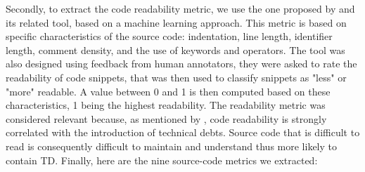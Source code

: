 
Secondly, to extract the code readability metric, we use the one proposed by \citet{Buse:tse2010} and its related tool, based on a machine learning approach. This metric is based on specific characteristics of the source code: indentation, line length, identifier length, comment density, and the use of keywords and operators. The tool was also designed using feedback from human annotators, they were asked to rate the readability of code snippets, that was then used to classify snippets as "less" or "more" readable. A value between 0 and 1 is then computed based on these characteristics, 1 being the highest readability. The readability metric was considered relevant because, as mentioned by \citet{BavotaR16}, code readability is strongly correlated with the introduction of technical debts. Source code that is difficult to read is consequently difficult to maintain and understand \citep{Buse:tse2010} thus more likely to contain \ac{TD}. Finally, here are the nine source-code metrics we extracted: \par

